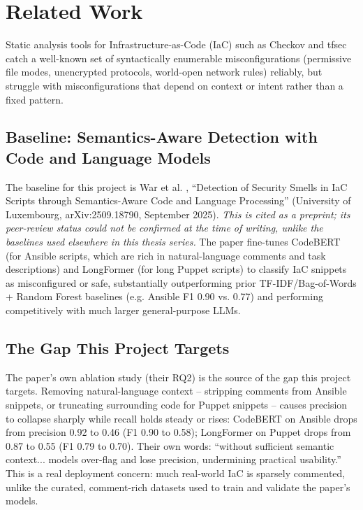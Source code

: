 \section{Related Work}
\label{sec:rw}

Static analysis tools for Infrastructure-as-Code (IaC) such as Checkov and tfsec catch a well-known set of syntactically enumerable misconfigurations (permissive file modes, unencrypted protocols, world-open network rules) reliably, but struggle with misconfigurations that depend on context or intent rather than a fixed pattern.

\subsection{Baseline: Semantics-Aware Detection with Code and Language Models}
The baseline for this project is War et al. \cite{War25}, ``Detection of Security Smells in IaC Scripts through Semantics-Aware Code and Language Processing'' (University of Luxembourg, arXiv:2509.18790, September 2025). \emph{This is cited as a preprint; its peer-review status could not be confirmed at the time of writing, unlike the baselines used elsewhere in this thesis series.} The paper fine-tunes CodeBERT (for Ansible scripts, which are rich in natural-language comments and task descriptions) and LongFormer (for long Puppet scripts) to classify IaC snippets as misconfigured or safe, substantially outperforming prior TF-IDF/Bag-of-Words + Random Forest baselines (e.g. Ansible F1 0.90 vs. 0.77) and performing competitively with much larger general-purpose LLMs.

\subsection{The Gap This Project Targets}
The paper's own ablation study (their RQ2) is the source of the gap this project targets. Removing natural-language context -- stripping comments from Ansible snippets, or truncating surrounding code for Puppet snippets -- causes precision to collapse sharply while recall holds steady or rises: CodeBERT on Ansible drops from precision 0.92 to 0.46 (F1 0.90 to 0.58); LongFormer on Puppet drops from 0.87 to 0.55 (F1 0.79 to 0.70). Their own words: ``without sufficient semantic context... models over-flag and lose precision, undermining practical usability.'' This is a real deployment concern: much real-world IaC is sparsely commented, unlike the curated, comment-rich datasets used to train and validate the paper's models.


